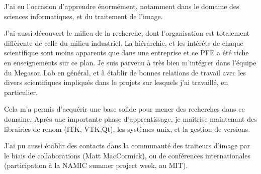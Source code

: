 J'ai eu l'occasion d'apprendre énormément,
notamment dans le domaine des sciences informatiques,
et du traitement de l'image.

J'ai aussi découvert le milieu de la recherche, dont l'organisation est
totalement différente de celle du milieu industriel.
La hiérarchie, et les intérêts de chaque scientifique sont moins apparents que dans une entreprise et ce PFE a été riche en enseignements sur ce plan.
Je suis parvenu à très bien m'intégrer dans l'équipe du Megason Lab en général,
et à établir de bonnes relations de travail avec les divers scientifiques
impliqués dans le projets sur lesquels j'ai travaillé, en particulier.

Cela m'a permis d'acquérir une base solide pour mener des recherches dans ce domaine.
Après une importante phase d'apprentissage, je maitrise maintenant des librairies de renom
(ITK, VTK,Qt), les systèmes unix, et la gestion de versions.

J'ai pu aussi établir des contacts dans la communauté
des traiteurs d'image par le biais de collaborations
(Matt MacCormick), ou de conférences internationales
(participation à la NAMIC summer project week, au MIT).
